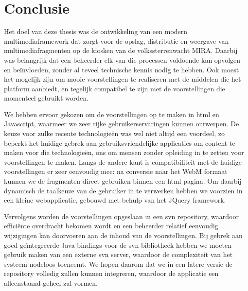 %
%

\chapter{Conclusie}



Het doel van deze thesis was de ontwikkeling van een modern multimediaframework dat zorgt voor de opslag, distributie en weergave van multimediafragmenten op de kiosken van de volkssterrenwacht MIRA. Daarbij was belangrijk dat een beheerder elk van die processen voldoende kan opvolgen en beïnvloeden, zonder al teveel technische kennis nodig te hebben. Ook moest het mogelijk zijn om mooie voorstellingen te realiseren met de middelen die het platform aanbiedt, en tegelijk compatibel te zijn met de voorstellingen die momenteel gebruikt worden.

We hebben ervoor gekozen om de voorstellingen op te maken in \ac{html} en Javascript, waarmeer we zeer rijke gebruikerservaringen kunnen ontwerpen. De keuze voor zulke recente technologieën was wel niet altijd een voordeel, zo beperkt het huidige gebrek aan gebruiksvriendelijke applicaties om content te maken voor die technologieën, ons om mensen zonder opleiding in te zetten voor voorstellingen te maken. Langs de andere kant is compatibiliteit met de huidige voorstellingen er zeer eenvoudig mee: na conversie naar het WebM formaat kunnen we de fragmenten direct gebruiken binnen een \ac{html} pagina. Om daarbij dynamisch de taalkeuze van de gebruiker in te verwerken hebben we voorzien in een kleine webapplicatie, gebouwd met behulp van het JQuery framework.

Vervolgens worden de voorstellingen opgeslaan in een \ac{svn} repository, waardoor efficiënte overdracht bekomen wordt en een beheerder relatief eenvoudig wijzigingen kan doorvoeren aan de inhoud van de voorstellingen. Bij gebrek aan goed geïntegreerde Java bindings voor de \ac{svn} bibliotheek hebben we moeten gebruik maken van een externe \ac{svn} server, waardoor de complexiteit van het systeem nodeloos toeneemt. We hopen daarom dat we in een latere versie de repository volledig zullen kunnen integreren, waardoor de applicatie een alleenstaand geheel zal vormen.

